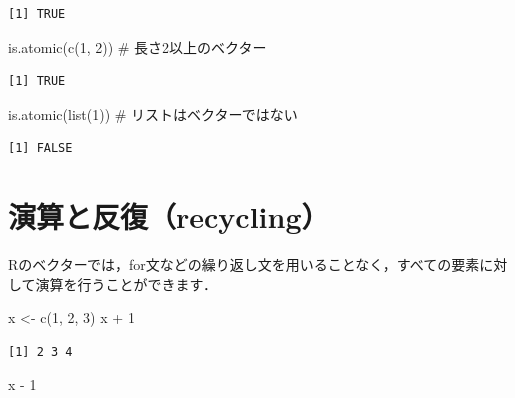 \documentclass[
  letterpaper,
  DIV=11,
  numbers=noendperiod]{scrreprt}
\newenvironment{Shaded}{\begin{snugshade}}{\end{snugshade}}
\newcommand{\CommentTok}[1]{\textcolor[rgb]{0.37,0.37,0.37}{#1}}
\newcommand{\DecValTok}[1]{\textcolor[rgb]{0.68,0.00,0.00}{#1}}
\newcommand{\FunctionTok}[1]{\textcolor[rgb]{0.28,0.35,0.67}{#1}}
\newcommand{\NormalTok}[1]{\textcolor[rgb]{0.00,0.23,0.31}{#1}}
\newcommand{\OtherTok}[1]{\textcolor[rgb]{0.00,0.23,0.31}{#1}}
\newcommand{\SpecialCharTok}[1]{\textcolor[rgb]{0.37,0.37,0.37}{#1}}
\begin{document}
\begin{verbatim}
[1] TRUE
\end{verbatim}

\begin{Shaded}
\begin{Highlighting}[]
\FunctionTok{is.atomic}\NormalTok{(}\FunctionTok{c}\NormalTok{(}\DecValTok{1}\NormalTok{, }\DecValTok{2}\NormalTok{)) }\CommentTok{\# 長さ2以上のベクター}
\end{Highlighting}
\end{Shaded}

\begin{verbatim}
[1] TRUE
\end{verbatim}

\begin{Shaded}
\begin{Highlighting}[]
\FunctionTok{is.atomic}\NormalTok{(}\FunctionTok{list}\NormalTok{(}\DecValTok{1}\NormalTok{)) }\CommentTok{\# リストはベクターではない}
\end{Highlighting}
\end{Shaded}

\begin{verbatim}
[1] FALSE
\end{verbatim}

\hypertarget{ux6f14ux7b97ux3068ux53cdux5fa9recycling}{%
\section{演算と反復（recycling）}\label{ux6f14ux7b97ux3068ux53cdux5fa9recycling}}

Rのベクターでは，for文などの繰り返し文を用いることなく，すべての要素に対して演算を行うことができます．

\begin{Shaded}
\begin{Highlighting}[]
\NormalTok{x }\OtherTok{\textless{}{-}} \FunctionTok{c}\NormalTok{(}\DecValTok{1}\NormalTok{, }\DecValTok{2}\NormalTok{, }\DecValTok{3}\NormalTok{)}
\NormalTok{x }\SpecialCharTok{+} \DecValTok{1}
\end{Highlighting}
\end{Shaded}

\begin{verbatim}
[1] 2 3 4
\end{verbatim}

\begin{Shaded}
\begin{Highlighting}[]
\NormalTok{x }\SpecialCharTok{{-}} \DecValTok{1}
\end{Highlighting}
\end{Shaded}
\end{document}
